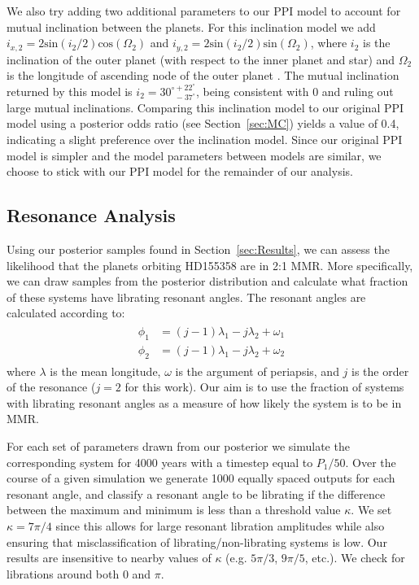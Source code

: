 We also try adding two additional parameters to our PPI model to account for mutual inclination between the planets.
For this inclination model we add $i_{x,2} = 2\textrm{sin}(i_2/2)\textrm{cos}(\Omega_2)$ and $i_{y,2} = 2\textrm{sin}(i_2/2)\textrm{sin}(\Omega_2)$, where $i_2$ is the inclination of the outer planet (with respect to the inner planet and star) and $\Omega_2$ is the longitude of ascending node of the outer planet \citep{Pal2009}. 
The mutual inclination returned by this model is $i_2 = 30^{\circ +22^{\circ}}_{\ \ -37^{\circ}}$, being consistent with 0 and ruling out large mutual inclinations. 
Comparing this inclination model to our original PPI model using a posterior odds ratio (see Section~\ref{sec:MC}) yields a value of 0.4, indicating a slight preference over the inclination model.
Since our original PPI model is simpler and the model parameters between models are similar, we choose to stick with our PPI model for the remainder of our analysis. 


\subsection{Resonance Analysis}
Using our posterior samples found in Section~\ref{sec:Results}, we can assess the likelihood that the planets orbiting HD155358 are in 2:1 MMR. 
More specifically, we can draw samples from the posterior distribution and calculate what fraction of these systems have librating resonant angles. 
The resonant angles are calculated according to:
\begin{align*}
\begin{split}
\phi_1 &= (j - 1)\lambda_1 - j\lambda_2 + \omega_1 \\
\phi_2 &= (j - 1)\lambda_1 - j\lambda_2 + \omega_2 
\end{split}
\end{align*}
where $\lambda$ is the mean longitude, $\omega$ is the argument of periapsis, and $j$ is the order of the resonance ($j=2$ for this work).
Our aim is to use the fraction of systems with librating resonant angles as a measure of how likely the system is to be in MMR. 

For each set of parameters drawn from our posterior we simulate the corresponding system for 4000 years with a timestep equal to $P_1/50$. 
Over the course of a given simulation we generate 1000 equally spaced outputs for each resonant angle, and classify a resonant angle to be librating if the difference between the maximum and minimum is less than a threshold value $\kappa$. 
We set $\kappa = 7\pi/4$ since this allows for large resonant libration amplitudes while also ensuring that misclassification of librating/non-librating systems is low. 
Our results are insensitive to nearby values of $\kappa$ (e.g. $5\pi/3$, $9\pi/5$, etc.).
We check for librations around both 0 and $\pi$.


